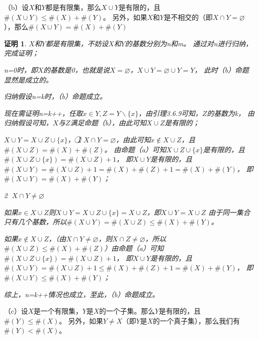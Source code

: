 \documentclass{article}
\theoremstyle{mystyle}
\theoremstyle{zproofstyle}
\newtheorem*{zproof}{证明}
\begin{document}
（b）设$X$和$Y$都是有限集，那么$X \cup Y$是有限的，且$\# (X \cup Y) \leq \# (X) + \# (Y)$。
另外，如果$X$和$Y$是不相交的（即$X \cap Y = \varnothing$），那么$\# (X \cup Y) = \# (X) + \# (Y)$
\begin{zproof}
  $X$和$Y$都是有限集，不妨设$X$和$Y$的基数分别为n和m。
  通过对n进行归纳，完成证明；

  n=0时，即$X$的基数是0，也就是说$X = \varnothing$，$X \cup Y = \varnothing \cup Y = Y$，
  此时（b）命题显然是成立的。

  归纳假设n=k时，（b）命题成立。 

  现在需证明n=k++，任取$x \in Y, Z=Y \backslash \{x\}$，由引理3.6.9可知，$Z$的基数为k，
  由归纳假设可知，$X$与$Z$满足命题（b），由此可知$X \cup Z$是有限的；

  $X \cup Y = X \cup Z \cup \{x\}$，
  \textcircled{1} $X \cap Y = \varnothing$，由此可知$x \not\in X \cup Z$，且$\#(X \cup Z) = \#(X)+\#(Z)$。
  由命题（a）可知$X \cup Z \cup \{x\}$是有限的，且$\#(X \cup Z \cup \{x\})=\#(X \cup Z)+1$，
  即$X \cup Y$是有限的，且$\#(X \cup Y) = \#(X \cup Z)+1 = \#(X) + \#(Z) + 1 = \#(X) + \#(Y)$，
  即$\#(X \cup Y) = \#(X) + \#(Y)$；

  \textcircled{2} $X \cap Y \neq \varnothing$

  如果$x \in X \cup Z$则$X \cup Y=X \cup Z \cup \{x\}=X \cup Z$，即$X \cup Y=X \cup Z$
  由于同一集合只有几个基数，所以$\#(X \cup Y)=\#(X \cup Z) \leq \#(X)+ \#(Y)$。

  如果$x \not\in X \cup Z$，（由$X \cap Y \neq \varnothing$，则$X \cap Z \neq \varnothing$，所以$\#(X \cup Z) \leq \#(X) + \#(Z)$）由命题（a）可知$\#(X \cup Z \cup \{x\})=\#(X \cup Z)+1$，
  即$X \cup Y$是有限的，且$\#(X \cup Y) = \#(X \cup Z)+1 \leq \#(X) + \#(Z) + 1 = \#(X) + \#(Y)$，
  即$\#(X \cup Y) \leq \#(X) + \#(Y)$；

  综上，n=k++情况也成立，至此，（b）命题成立。
\end{zproof}

（c）设$X$是一个有限集，$Y$是$X$的一个子集。那么$Y$是有限的，且$\# (Y) \leq \# (X)$。
另外，如果$Y \neq X$（即$Y$是$X$的一个真子集），那么我们有$\#(Y) < \#(X)$。
\end{document}
